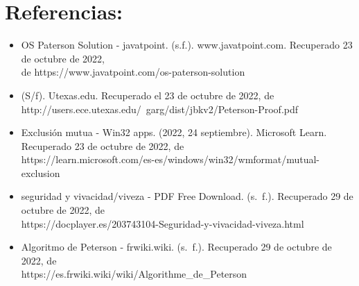 \documentclass[answers]{exam}
\begin{document}
\section{Referencias:}
\begin{itemize}
    \item OS Paterson Solution - javatpoint. (s.f.). www.javatpoint.com. Recuperado 23 de octubre de 2022,\\ de https://www.javatpoint.com/os-paterson-solution
    \item (S/f). Utexas.edu. Recuperado el 23 de octubre de 2022, de\\ http://users.ece.utexas.edu/~garg/dist/jbkv2/Peterson-Proof.pdf
    \item Exclusión mutua - Win32 apps. (2022, 24 septiembre). Microsoft Learn. Recuperado 23 de octubre de 2022, de\\ https://learn.microsoft.com/es-es/windows/win32/wmformat/mutual-exclusion
     \item seguridad y vivacidad/viveza - PDF Free Download. (s. f.). Recuperado 29 de octubre de 2022, de\\ https://docplayer.es/203743104-Seguridad-y-vivacidad-viveza.html
    \item Algoritmo de Peterson - frwiki.wiki. (s. f.). Recuperado 29 de octubre de 2022, de\\ https://es.frwiki.wiki/wiki/Algorithme_de_Peterson
\end{itemize}
\end{document}
